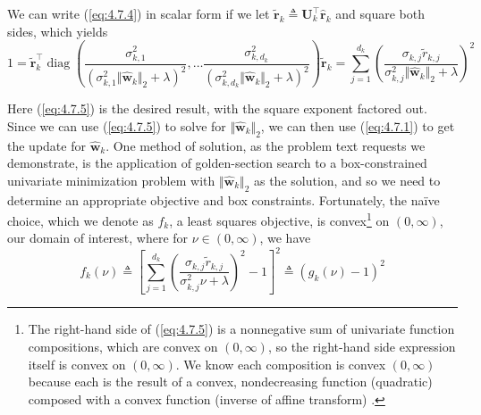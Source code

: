 \documentclass{article}
\numberwithin{equation}{section}
\begin{document}
We can write (\ref{eq:4.7.4}) in scalar form if we let
$ \tilde{\mathbf{r}}_k \triangleq \mathbf{U}_k^\top\hat{\mathbf{r}}_k $ and
square both sides, which yields
\begin{equation} \label{eq:4.7.5}
    1 =
    \tilde{\mathbf{r}}_k^\top
    \operatorname{diag}
    \left(
        \frac{
            \sigma_{k, 1}^2
        }{
            (\sigma_{k, 1}^2\Vert\hat{\mathbf{w}}_k\Vert_2 + \lambda)^2
        },
        \ldots \frac{
            \sigma_{k, d_k}^2
        }{
            (\sigma_{k, d_k}^2\Vert\hat{\mathbf{w}}_k\Vert_2 + \lambda)^2
        }
    \right)
    \tilde{\mathbf{r}}_k =
    \sum_{j = 1}^{d_k}
    \left(
        \frac{
            \sigma_{k, j}\tilde{r}_{k, j}
        }{
            \sigma_{k, j}^2\Vert\hat{\mathbf{w}}_k\Vert_2 + \lambda
        }
    \right)^2
\end{equation}

Here (\ref{eq:4.7.5}) is the desired result, with the square exponent factored
out. Since we can use (\ref{eq:4.7.5}) to solve for
$ \Vert\hat{\mathbf{w}}_k\Vert_2 $, we can then use (\ref{eq:4.7.1}) to get
the update for $ \hat{\mathbf{w}}_k $. One method of solution, as the problem
text requests we demonstrate, is the application of golden-section search to a
box-constrained univariate minimization problem with
$ \Vert\hat{\mathbf{w}}_k\Vert_2 $ as the solution, and so we need to
determine an appropriate objective and box constraints. Fortunately, the
na\"{i}ve choice, which we denote as $ f_k $, a least squares objective, is
convex\footnote{
    The right-hand side of (\ref{eq:4.7.5}) is a nonnegative sum of univariate
    function compositions, which are convex on $ (0, \infty) $, so the
    right-hand side expression itself is convex on $ (0, \infty) $. We know
    each composition is convex $ (0, \infty) $ because each is the result of a
    convex, nondecreasing function (quadratic) composed with a convex function
    (inverse of affine transform) \cite{bv_convex_opt}.
} on $ (0, \infty) $, our domain of interest, where for
$ \nu \in (0, \infty) $, we have
\begin{equation} \label{eq:4.7.6}
    f_k(\nu) \triangleq
    \left[
        \sum_{j = 1}^{d_k}
        \left(
        \frac{
            \sigma_{k, j}\tilde{r}_{k, j}
        }{
            \sigma_{k, j}^2\nu + \lambda
        }
        \right)^2 - 1
    \right]^2 \triangleq
    (g_k(\nu) - 1)^2
\end{equation}
\end{document}

